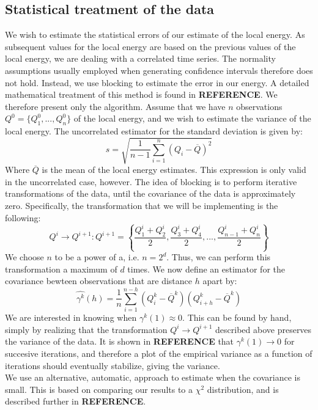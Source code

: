 \documentclass[a4paper, 10pt]{article}
\begin{document}
	\subsection{Statistical treatment of the data}
	We wish to estimate the statistical errors of our estimate of the local energy. As subsequent values for the local energy are based on the previous values of the local energy, we are dealing with a correlated time series. The normality assumptions usually employed when generating confidence intervals therefore does not hold. Instead, we use blocking to estimate the error in our energy. A detailed mathematical treatment of this method is found in \textbf{REFERENCE}. We therefore present only the algorithm. Assume that we have $n$ observations $Q^0=\{Q_1^0,...,Q_n^0\}$ of the local energy, and we wish to estimate the variance of the local energy. The uncorrelated estimator for the standard deviation is given by:
	\begin{equation}
	s=\sqrt{\frac{1}{n-1}\sum_{i=1}^n (Q_i-\overline{Q})^2}
	\end{equation}
	Where $\overline{Q}$ is the mean of the local energy estimates. This expression is only valid in the uncorrelated case, however. The idea of blocking is to perform iterative transformations of the data, until the covariance of the data is approximately zero. Specifically, the transformation that we will be implementing is the following:
	\begin{equation}
	Q^i \rightarrow Q^{i+1}: Q^{i+1} = \left\{ \frac{Q^i_1+Q^i_2}{2}, \frac{Q^i_3+Q^i_4}{2},...,\frac{Q^i_{n-1}+Q^i_{n}}{2}\right\}
	\end{equation}
	We choose $n$ to be a power of a, i.e. $n=2^d$. Thus, we can perform this transformation a maximum of $d$ times. We now define an estimator for the covariance bewteen observations that are distance $h$ apart by:
	\begin{equation}
	\hat{\gamma^k}(h)=\frac{1}{n}\sum_{i=1}^{n-h}(Q_i^k-\overline{Q}^k)(Q_{i+h}^k-\overline{Q}^k)
	\end{equation}
	We are interested in knowing when $\gamma^k(1)\approx 0$. This can be found by hand, simply by realizing that the transformation $Q^i \rightarrow Q^{i+1}$ described above preserves the variance of the data. It is shown in \textbf{REFERENCE} that $\gamma^k(1) \rightarrow 0$ for succesive iterations, and therefore a plot of the empirical variance as a function of iterations should eventually stabilize, giving the variance. \\
	\linebreak
	We use an alternative, automatic, approach to estimate when the covariance is small. This is based on comparing our results to a $\chi^2$ distribution, and is described further in \textbf{REFERENCE}.
\end{document}
